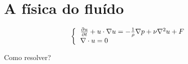 \documentclass{beamer}
\begin{document}
\section{A física do fluído}
\begin{frame}
	    \begin{equation}
		\left\lbrace \begin{tabular}{ll}
				$\frac{\partial u}{\partial t} + u \cdot \nabla u = -\frac{1}{\rho}\nabla p +\nu \nabla ^2 u + F$ \\
				$\nabla \cdot u = 0$
					\end{tabular}		 \right.
    \end{equation} 
    
    Como resolver?
\end{frame}
\end{document}
